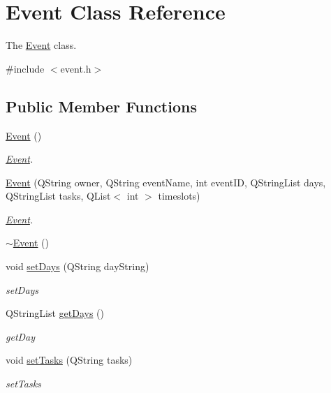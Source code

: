 \hypertarget{class_event}{}\section{Event Class Reference}
\label{class_event}


The \hyperlink{class_event}{Event} class.  




{\ttfamily \#include $<$event.\+h$>$}

\subsection*{Public Member Functions}
\begin{DoxyCompactItemize}
\item 
\hyperlink{class_event_a5a40dd4708297f7031e29b39e039ae10}{Event} ()
\begin{DoxyCompactList}\small\item\em \hyperlink{class_event}{Event}. \end{DoxyCompactList}\item 
\hyperlink{class_event_a7d7306f5661b66b543be76e849f20329}{Event} (Q\+String owner, Q\+String event\+Name, int event\+ID, Q\+String\+List days, Q\+String\+List tasks, Q\+List$<$ int $>$ timeslots)
\begin{DoxyCompactList}\small\item\em \hyperlink{class_event}{Event}. \end{DoxyCompactList}\item 
\hyperlink{class_event_a7704ec01ce91e673885792054214b3d2}{$\sim$\+Event} ()
\item 
void \hyperlink{class_event_a0cc103761f52f4a7c2e4d935c8e0809e}{set\+Days} (Q\+String day\+String)
\begin{DoxyCompactList}\small\item\em set\+Days \end{DoxyCompactList}\item 
Q\+String\+List \hyperlink{class_event_ac8aac8eac691a08cf0822a380fe29eb2}{get\+Days} ()
\begin{DoxyCompactList}\small\item\em get\+Day \end{DoxyCompactList}\item 
void \hyperlink{class_event_a23cb6c79d76f416edcbdc2044fa73138}{set\+Tasks} (Q\+String tasks)
\begin{DoxyCompactList}\small\item\em set\+Tasks \end{DoxyCompactList}\item 

\end{DoxyCompactItemize}
